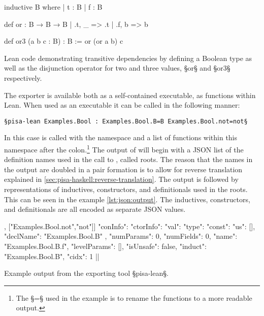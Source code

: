 \begin{listing}[ht]
\begin{LeanCode}
inductive B where
  | t : B
  | f : B

def or : B → B → B
  | .t, _ => .t
  | .f, b => b

def or3 (a b c : B) : B := or (or a b) c
\end{LeanCode}
\caption
  [Lean code demonstrating transitive dependencies.]
  {Lean code demonstrating transitive dependencies by defining a Boolean type as well as the disjunction operator for two and three values, §or§ and §or3§ respectively.}
\label{lst:lean:transitive-dependencies}
\end{listing}

The exporter is available both as a self-contained executable, as functions within Lean.
When used as an executable it can be called in the following manner:

\begin{verbatim}
§pisa-lean Examples.Bool : Examples.Bool.B=B Examples.Bool.not=not§
\end{verbatim}

In this case  is called with the namespace  and a list of functions within this namespace after the colon.\footnote{The §=§ used in the example is to rename the functions to a more readable output.}
The output of  will begin with a JSON list of the definition names used in the call to , called roots.
The reason that the names in the output are doubled in a pair formation is to allow for reverse translation explained in \cref{sec:pisa-haskell:reverse-translation}.
The output is followed by representations of inductives, constructors, and definitionals used in the roots.
This can be seen in the example \cref{lst:json:output}.
The inductives, constructors, and definitionals are all encoded as separate JSON values.

\begin{listing}[H]
\begin{json}
[["Examples.Bool.B","B"], ["Examples.Bool.not","not"]]
{
  "conInfo": {
    "ctorInfo": {
      "val": {
        "type": {
          "const": {
            "us": [],
            "declName": "Examples.Bool.B"
          }
        },
        "numParams": 0,
        "numFields": 0,
        "name": "Examples.Bool.B.f",
        "levelParams": [],
        "isUnsafe": false,
        "induct": "Examples.Bool.B",
        "cidx": 1
      }
    }
  }
}
|\truncated|
\end{json}
\caption{Example output from the exporting tool §pisa-lean§.}
\label{lst:json:output}
\end{listing}

